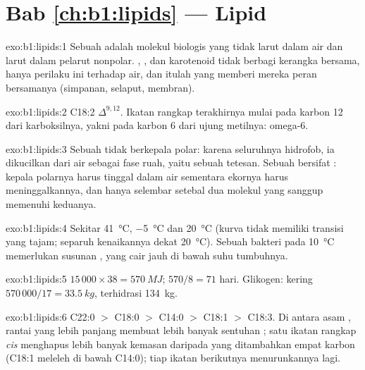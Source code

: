 \section*{Bab \ref{ch:b1:lipids} --- Lipid}

\begin{solution}{exo:b1:lipids:1}
Sebuah  adalah molekul biologis yang tidak larut dalam air dan
larut dalam pelarut nonpolar. , ,  dan karotenoid
tidak berbagi kerangka bersama, hanya perilaku ini terhadap air, dan
itulah yang memberi mereka peran bersamanya (simpanan, selaput, membran).
\end{solution}

\begin{solution}{exo:b1:lipids:2}
C18:2 $\Delta^{9,12}$. Ikatan rangkap terakhirnya mulai pada karbon 12
dari karboksilnya, yakni pada karbon 6 dari ujung metilnya: omega-6.
\end{solution}

\begin{solution}{exo:b1:lipids:3}
Sebuah  tidak berkepala polar: karena seluruhnya hidrofob,
ia dikucilkan dari air sebagai fase ruah, yaitu sebuah tetesan. Sebuah
 bersifat : kepala polarnya harus tinggal dalam air
sementara ekornya harus meninggalkannya, dan hanya selembar setebal dua
molekul yang sanggup memenuhi keduanya.
\end{solution}

\begin{solution}{exo:b1:lipids:4}
Sekitar \qty{41}{\celsius}, \qty{-5}{\celsius} dan \qty{20}{\celsius}
(kurva  tidak memiliki transisi yang tajam; separuh
kenaikannya dekat \qty{20}{\celsius}). Sebuah bakteri pada
\qty{10}{\celsius} memerlukan susunan , yang cair jauh di
bawah suhu tumbuhnya.
\end{solution}

\begin{solution}{exo:b1:lipids:5}
$15\,000\times 38 = \qty{570}{MJ}$; $570/8 = 71$ hari. Glikogen: kering
$570\,000/17 = \qty{33.5}{kg}$, terhidrasi \qty{134}{kg}.
\end{solution}

\begin{solution}{exo:b1:lipids:6}
C22:0 $>$ C18:0 $>$ C14:0 $>$ C18:1 $>$ C18:3. Di antara asam ,
rantai yang lebih panjang membuat lebih banyak sentuhan ;
satu ikatan rangkap \emph{cis} menghapus lebih banyak kemasan daripada
yang ditambahkan empat karbon (C18:1 meleleh di bawah C14:0); tiap
ikatan berikutnya menurunkannya lagi.
\end{solution}


